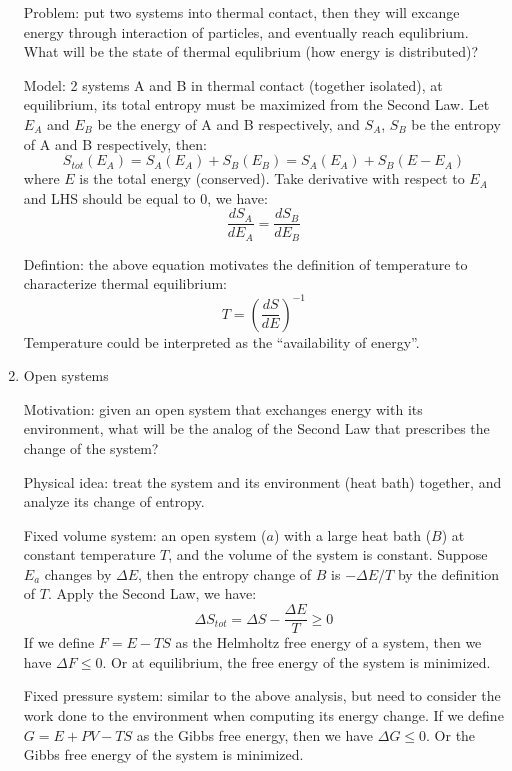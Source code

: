 \documentclass{report}
\begin{document}
\begin{enumerate}
Problem: put two systems into thermal contact, then they will excange energy through interaction of particles, and eventually reach equlibrium. What will be the state of thermal equlibrium (how energy is distributed)?

Model: 2 systems A and B in thermal contact (together isolated), at equilibrium, its total entropy must be maximized from the Second Law. Let $E_A$ and $E_B$ be the energy of A and B respectively, and $S_A$, $S_B$ be the entropy of A and B respectively, then: 
\begin{equation}
S_{tot}(E_A) = S_A(E_A) + S_B(E_B) = S_A(E_A) + S_B(E - E_A)
\end{equation}
where $E$ is the total energy (conserved). Take derivative with respect to $E_A$ and LHS should be equal to 0, we have: 
\begin{equation}
\frac{dS_A}{dE_A} = \frac{dS_B}{dE_B}
\end{equation}

Defintion: the above equation motivates the definition of temperature to characterize thermal equilibrium: 
\begin{equation}
T = (\frac{dS}{dE})^{-1}
\end{equation}
Temperature could be interpreted as the ``availability of energy''. 

\item{Open systems}

Motivation: given an open system that exchanges energy with its environment, what will be the analog of the Second Law that prescribes the change of the system? 

Physical idea: treat the system and its environment (heat bath) together, and analyze its change of entropy. 

Fixed volume system: an open system ($a$) with a large heat bath ($B$) at constant temperature $T$, and the volume of the system is constant. Suppose $E_a$ changes by $\Delta E$, then the entropy change of $B$ is $-\Delta E/T$ by the definition of $T$. Apply the Second Law, we have: 
\begin{equation}
\Delta S_{tot} = \Delta S - \frac{\Delta E}{T} \geq 0 
\end{equation}
If we define $F = E - TS$ as the Helmholtz free energy of a system, then we have $\Delta F \leq 0$. Or at equilibrium, the free energy of the system is minimized.  

Fixed pressure system: similar to the above analysis, but need to consider the work done to the environment when computing its energy change. If we define $G = E + PV - TS$ as the Gibbs free energy, then we have $\Delta G \leq 0$. Or the Gibbs free energy of the system is minimized.


\end{enumerate}
\end{document}
